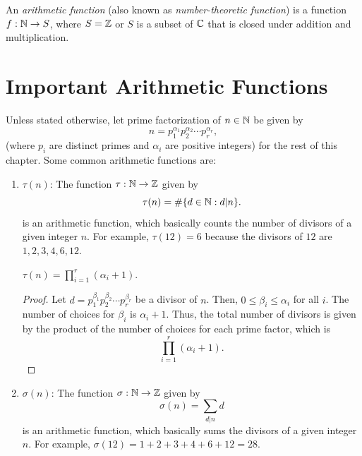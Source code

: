 \begin{definition}
    An \textit{arithmetic function} (also known as \textit{number-theoretic function}) is a function $f: \mathbb{N} \to S$, where $S = \mathbb{Z}$ or $S$ is a subset of $\mathbb{C}$ that is closed under addition and multiplication. 
\end{definition}

\section{Important Arithmetic Functions}
Unless stated otherwise, let prime factorization of $n \in \mathbb{N}$ be given by \[n = p_1^{\alpha_1} p_2^{\alpha_2} \cdots p_r^{\alpha_r},\] (where $p_i$ are distinct primes and $\alpha_i$ are positive integers) for the rest of this chapter. Some common arithmetic functions are:
\begin{enumerate}
    \item $\tau(n)$:  The function $\tau: \mathbb{N} \to \mathbb{Z}$ given by \[\tau(n) = \#\{d \in \mathbb{N}: d|n\}.\] is an arithmetic function, which basically counts the number of divisors of a given integer $n$. For example, $\tau(12) = 6$ because the divisors of $12$ are $1, 2, 3, 4, 6, 12$.

    \begin{prop}
        $\tau(n) = \prod_{i=1}^r (\alpha_i + 1)$.
    \end{prop}
    \begin{proof}
        Let $d = p_1^{\beta_1} p_2^{\beta_2} \cdots p_r^{\beta_r}$ be a divisor of $n$. Then, $0 \leq \beta_i \leq \alpha_i$ for all $i$. The number of choices for $\beta_i$ is $\alpha_i + 1$. Thus, the total number of divisors is given by the product of the number of choices for each prime factor, which is \[\prod_{i=1}^r (\alpha_i + 1).\]
    \end{proof}

    \item $\sigma(n)$: The function $\sigma: \mathbb{N} \to \mathbb{Z}$ given by \[\sigma(n) = \sum_{d|n} d\] is an arithmetic function, which basically sums the divisors of a given integer $n$. For example, $\sigma(12) = 1 + 2 + 3 + 4 + 6 + 12 = 28$.
    

\end{enumerate}
